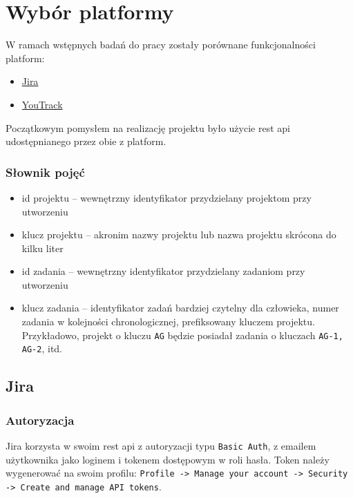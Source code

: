 \section{Wybór platformy}
W ramach wstępnych badań do pracy zostały porównane funkcjonalności platform:
\begin{itemize}
    \item \href{https://www.atlassian.com/software/jira}{Jira}
    \item \href{https://www.jetbrains.com/youtrack/}{YouTrack}
\end{itemize}
Początkowym pomysłem na realizację projektu było użycie rest api udostępnianego przez obie z platform. \cite[]{JiraApiDocumentation} \cite[]{YouTrackApiDocumentation}

\subsubsection*{Słownik pojęć}
\begin{itemize}
    \item id projektu -- wewnętrzny identyfikator przydzielany projektom przy utworzeniu
    \item klucz projektu -- akronim nazwy projektu lub nazwa projektu skrócona do kilku liter
    \item id zadania -- wewnętrzny identyfikator przydzielany zadaniom przy utworzeniu
    \item klucz zadania -- identyfikator zadań bardziej czytelny dla człowieka, numer zadania w kolejności chronologicznej, prefiksowany kluczem projektu.
    Przykładowo, projekt o kluczu \texttt{AG} będzie posiadał zadania o kluczach \texttt{AG-1, AG-2}, itd.
\end{itemize}

\subsection*{Jira}
\subsubsection*{Autoryzacja}
Jira korzysta w swoim rest api z autoryzacji typu \texttt{Basic Auth}, z emailem użytkownika jako loginem i tokenem dostępowym w roli hasła.
Token należy wygenerować na swoim profilu: \texttt{Profile -> Manage your account -> Security -> Create and manage API tokens}.
